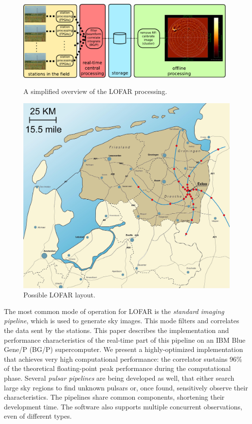 \documentclass{sig-alternate}
\begin{document}
\begin{figure}
\begin{minipage}[b]{11cm}
\includegraphics[width=11cm]{lofar-overview.pdf}
\caption{A simplified overview of the LOFAR processing.}
\label{fig:lofar-overview}
\end{minipage}
\hfill
\begin{minipage}[b]{56mm}
\includegraphics[width=\columnwidth]{map.jpg}
\caption{Possible LOFAR layout.}
\label{fig:map}
\end{minipage}
\end{figure}

The most common mode of operation for LOFAR is the 
\emph{standard imaging pipeline}, which is used to generate sky images.
This mode filters and correlates the data sent by the stations.
This paper describes the implementation and
performance characteristics of the real-time part of this pipeline on an IBM Blue Gene/P (BG/P)
supercomputer.
We present a highly-optimized implementation that achieves very high
computational performance: the correlator sustains 96\% of the theoretical
floating-point peak performance during the computational phase.
Several \emph{pulsar pipelines\/} are being developed as well, that either
search large sky regions to find unknown pulsars or, once found, sensitively
observe their characteristics.
The pipelines share common components, shortening their development time. 
The software also supports multiple concurrent observations, even of different
types.
\end{document}
